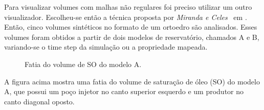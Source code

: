 	Para visualizar volumes com malhas não regulares foi preciso utilizar um outro visualizador. Escolheu-se então a técnica proposta por \textit{Miranda e Celes}~\cite{miranda} em . Então, cinco volumes sintéticos no formato de um ortoedro são analisados. Esses volumes foram obtidos a partir de dois modelos de reservatório, chamados A e B, variando-se o time step da simulação ou a propriedade mapeada.
	
\begin{figure}[h]
	\centering
	\caption{Fatia do volume de SO do modelo A.}
	\label{fig:box_slice}
\end{figure}

	A figura acima mostra uma fatia do volume de saturação de óleo (SO) do modelo A, que possui um poço injetor no canto superior esquerdo e um produtor no canto diagonal oposto.


